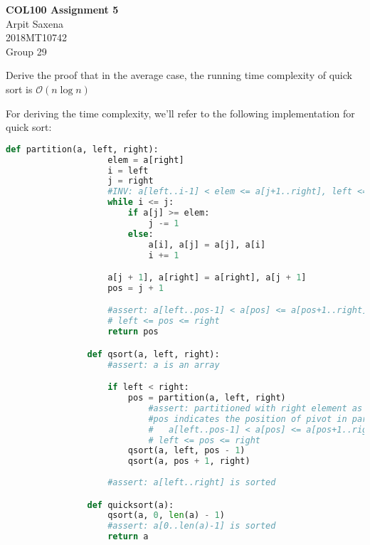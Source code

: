 \documentclass[answers]{exam}
\renewcommand{\O}[1]{\mathcal{O}\left(#1\right)}
\begin{document}
    \shadedsolutions
    \lstset{autogobble=true, commentstyle=\ttfamily}

    \begin{center}
        \textbf{COL100 Assignment 5}\\
        Arpit Saxena\\
        2018MT10742\\
        Group 29
    \end{center}

    \begin{questions}
        \question Derive the proof that in the average case, the running time complexity of quick sort is \(\O{n \log n}\)
        \begin{solution}
            For deriving the time complexity, we'll refer to the following implementation for quick sort:
            \begin{lstlisting}[language=Python]
                def partition(a, left, right):
                    elem = a[right]
                    i = left
                    j = right
                    #INV: a[left..i-1] < elem <= a[j+1..right], left <= pos <= right
                    while i <= j:
                        if a[j] >= elem:
                            j -= 1
                        else:
                            a[i], a[j] = a[j], a[i]
                            i += 1

                    a[j + 1], a[right] = a[right], a[j + 1]
                    pos = j + 1

                    #assert: a[left..pos-1] < a[pos] <= a[pos+1..right], 
                    # left <= pos <= right
                    return pos

                def qsort(a, left, right):
                    #assert: a is an array

                    if left < right:
                        pos = partition(a, left, right) 
                            #assert: partitioned with right element as pivot.
                            #pos indicates the position of pivot in partitioned array
                            #   a[left..pos-1] < a[pos] <= a[pos+1..right], 
                            # left <= pos <= right
                        qsort(a, left, pos - 1)
                        qsort(a, pos + 1, right)
                    
                    #assert: a[left..right] is sorted

                def quicksort(a):
                    qsort(a, 0, len(a) - 1)
                    #assert: a[0..len(a)-1] is sorted
                    return a
            \end{lstlisting}


\end{solution}
\end{questions}
\end{document}
